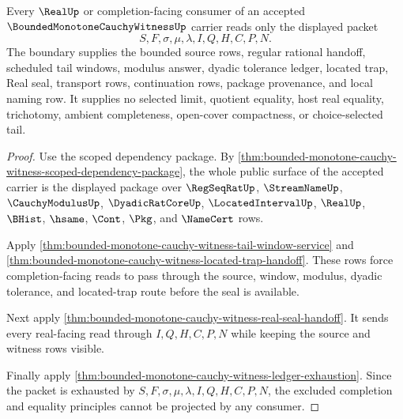 \begin{theorem}
\label{thm:bounded-monotone-cauchy-witness-completion-boundary}
Every $\RealUp$ or completion-facing consumer of an accepted $\BoundedMonotoneCauchyWitnessUp$ carrier reads only the displayed packet
$$
S,F,\sigma,\mu,\lambda,I,Q,H,C,P,N.
$$
The boundary supplies the bounded source rows, regular rational handoff, scheduled tail windows, modulus answer, dyadic tolerance ledger, located trap, Real seal, transport rows, continuation rows, package provenance, and local naming row. It supplies no selected limit, quotient equality, host real equality, trichotomy, ambient completeness, open-cover compactness, or choice-selected tail.
\end{theorem}
\begin{proof}
Use the scoped dependency package. By \autoref{thm:bounded-monotone-cauchy-witness-scoped-dependency-package}, the whole public surface of the accepted carrier is the displayed package over $\RegSeqRatUp$, $\StreamNameUp$, $\CauchyModulusUp$, $\DyadicRatCoreUp$, $\LocatedIntervalUp$, $\RealUp$, $\BHist$, $\hsame$, $\Cont$, $\Pkg$, and $\NameCert$ rows.

Apply \autoref{thm:bounded-monotone-cauchy-witness-tail-window-service} and \autoref{thm:bounded-monotone-cauchy-witness-located-trap-handoff}. These rows force completion-facing reads to pass through the source, window, modulus, dyadic tolerance, and located-trap route before the seal is available.

Next apply \autoref{thm:bounded-monotone-cauchy-witness-real-seal-handoff}. It sends every real-facing read through $I,Q,H,C,P,N$ while keeping the source and witness rows visible.

Finally apply \autoref{thm:bounded-monotone-cauchy-witness-ledger-exhaustion}. Since the packet is exhausted by $S,F,\sigma,\mu,\lambda,I,Q,H,C,P,N$, the excluded completion and equality principles cannot be projected by any consumer.
\end{proof}

